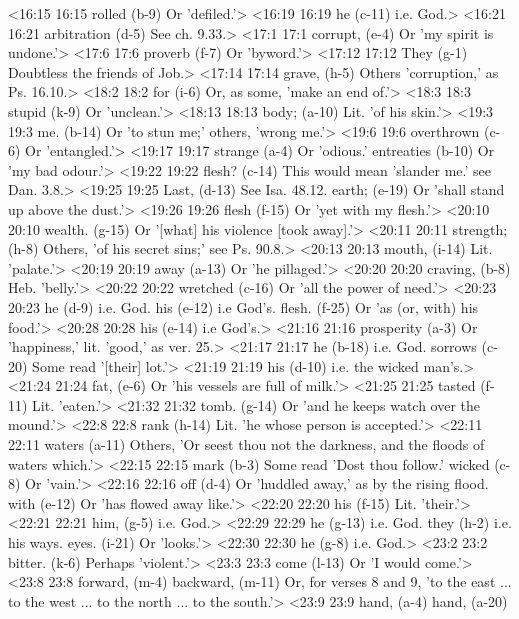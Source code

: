 <16:15 16:15  rolled (b-9)  Or 'defiled.'>
<16:19 16:19  he (c-11)  i.e. God.>
<16:21 16:21  arbitration (d-5)  See ch. 9.33.>
<17:1 17:1  corrupt, (e-4)  Or 'my spirit is undone.'>
<17:6 17:6  proverb (f-7)  Or 'byword.'>
<17:12 17:12  They (g-1)  Doubtless the friends of Job.>
<17:14 17:14  grave, (h-5)  Others 'corruption,' as Ps. 16.10.>
<18:2 18:2  for (i-6)  Or, as some, 'make an end of.'>
<18:3 18:3  stupid (k-9)  Or 'unclean.'>
<18:13 18:13  body; (a-10)  Lit. 'of his skin.'>
<19:3 19:3  me. (b-14)  Or 'to stun me;' others, 'wrong me.'>
<19:6 19:6  overthrown (c-6)  Or 'entangled.'>
<19:17 19:17  strange (a-4)  Or 'odious.'
  entreaties (b-10)  Or 'my bad odour.'>
<19:22 19:22  flesh? (c-14)  This would mean 'slander me.' see Dan. 3.8.>
<19:25 19:25  Last, (d-13)  See Isa. 48.12.
  earth; (e-19)  Or 'shall stand up above the dust.'>
<19:26 19:26  flesh (f-15)  Or 'yet with my flesh.'>
<20:10 20:10  wealth. (g-15)  Or '[what] his violence [took away].'>
<20:11 20:11  strength; (h-8)  Others, 'of his secret sins;' see Ps. 90.8.>
<20:13 20:13  mouth, (i-14)  Lit. 'palate.'>
<20:19 20:19  away (a-13)  Or 'he pillaged.'>
<20:20 20:20  craving, (b-8)  Heb. 'belly.'>
<20:22 20:22  wretched (c-16)  Or 'all the power of need.'>
<20:23 20:23  he (d-9)  i.e. God.
  his (e-12) i.e God's.
  flesh. (f-25)  Or 'as (or, with) his food.'>
<20:28 20:28  his (e-14)  i.e God's.>
<21:16 21:16  prosperity (a-3)  Or 'happiness,' lit. 'good,' as ver. 25.>
<21:17 21:17  he (b-18)  i.e. God.
  sorrows (c-20)  Some read '[their] lot.'>
<21:19 21:19  his (d-10)  i.e. the wicked man's.>
<21:24 21:24  fat, (e-6)  Or 'his vessels are full of milk.'>
<21:25 21:25  tasted (f-11)  Lit. 'eaten.'>
<21:32 21:32  tomb. (g-14)  Or 'and he keeps watch over the mound.'>
<22:8 22:8  rank (h-14)  Lit. 'he whose person is accepted.'>
<22:11 22:11  waters (a-11)  Others, 'Or seest thou not the darkness, and the floods of  waters which.'>
<22:15 22:15  mark (b-3)  Some read 'Dost thou follow.'
  wicked (c-8)  Or 'vain.'>
<22:16 22:16  off (d-4)  Or 'huddled away,' as by the rising flood.
  with (e-12)  Or 'has flowed away like.'>
<22:20 22:20  his (f-15)  Lit. 'their.'>
<22:21 22:21  him, (g-5) i.e. God.>
<22:29 22:29  he (g-13) i.e. God.
  they (h-2)  i.e. his ways.
  eyes. (i-21)  Or 'looks.'>
<22:30 22:30  he (g-8)  i.e. God.>
<23:2 23:2  bitter. (k-6)  Perhaps 'violent.'>
<23:3 23:3  come (l-13)  Or 'I would come.'>
<23:8 23:8  forward, (m-4)  backward, (m-11)
  Or, for verses 8 and 9, 'to the east ... to the west ... to  the north ... to the south.'>
<23:9 23:9  hand, (a-4)  hand, (a-20)
